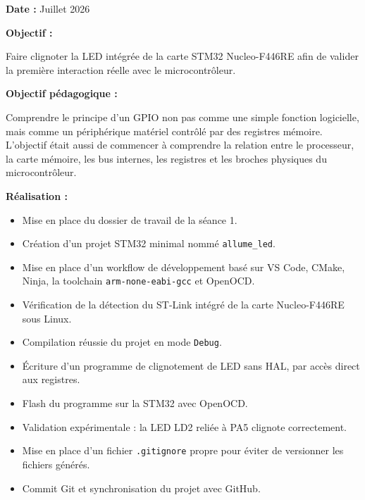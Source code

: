 \documentclass[11pt,a4paper]{article}
\begin{document}
	\begin{sessionbox}
		
		\textbf{Date :} Juillet 2026
		
		\vspace{0.3cm}
		
		\textbf{Objectif :}
		
		Faire clignoter la LED intégrée de la carte STM32 Nucleo-F446RE afin de valider la première interaction réelle avec le microcontrôleur.
		
		\vspace{0.3cm}
		
		\textbf{Objectif pédagogique :}
		
		Comprendre le principe d'un GPIO non pas comme une simple fonction logicielle, mais comme un périphérique matériel contrôlé par des registres mémoire. L'objectif était aussi de commencer à comprendre la relation entre le processeur, la carte mémoire, les bus internes, les registres et les broches physiques du microcontrôleur.
		
		\vspace{0.3cm}
		
		\textbf{Réalisation :}
		
		\begin{itemize}
			\item Mise en place du dossier de travail de la séance 1.
			\item Création d'un projet STM32 minimal nommé \texttt{allume\_led}.
			\item Mise en place d'un workflow de développement basé sur VS Code, CMake, Ninja, la toolchain \texttt{arm-none-eabi-gcc} et OpenOCD.
			\item Vérification de la détection du ST-Link intégré de la carte Nucleo-F446RE sous Linux.
			\item Compilation réussie du projet en mode \texttt{Debug}.
			\item Écriture d'un programme de clignotement de LED sans HAL, par accès direct aux registres.
			\item Flash du programme sur la STM32 avec OpenOCD.
			\item Validation expérimentale : la LED LD2 reliée à PA5 clignote correctement.
			\item Mise en place d'un fichier \texttt{.gitignore} propre pour éviter de versionner les fichiers générés.
			\item Commit Git et synchronisation du projet avec GitHub.
		\end{itemize}
		

\end{sessionbox}
\end{document}
